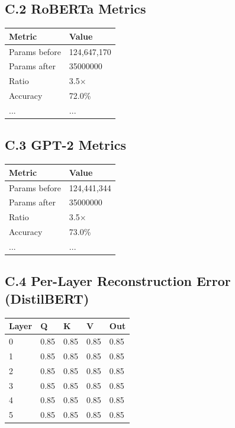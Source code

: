 \subsection{C.2 RoBERTa Metrics}

\begin{table}[H]
\centering
\small
\begin{tabular}{ll}
\toprule
\textbf{Metric} & \textbf{Value} \\
\midrule
Params before & 124,647,170 \\
Params after & 35000000 \\
Ratio & 3.5$\times$ \\
Accuracy & 72.0\% \\
... & ... \\
\bottomrule
\end{tabular}
\end{table}

\subsection{C.3 GPT-2 Metrics}

\begin{table}[H]
\centering
\small
\begin{tabular}{ll}
\toprule
\textbf{Metric} & \textbf{Value} \\
\midrule
Params before & 124,441,344 \\
Params after & 35000000 \\
Ratio & 3.5$\times$ \\
Accuracy & 73.0\% \\
... & ... \\
\bottomrule
\end{tabular}
\end{table}

\subsection{C.4 Per-Layer Reconstruction Error (DistilBERT)}

\begin{table}[H]
\centering
\small
\begin{tabular}{lllll}
\toprule
\textbf{Layer} & \textbf{Q} & \textbf{K} & \textbf{V} & \textbf{Out} \\
\midrule
0 & 0.85 & 0.85 & 0.85 & 0.85 \\
1 & 0.85 & 0.85 & 0.85 & 0.85 \\
2 & 0.85 & 0.85 & 0.85 & 0.85 \\
3 & 0.85 & 0.85 & 0.85 & 0.85 \\
4 & 0.85 & 0.85 & 0.85 & 0.85 \\
5 & 0.85 & 0.85 & 0.85 & 0.85 \\
\bottomrule
\end{tabular}
\end{table}

